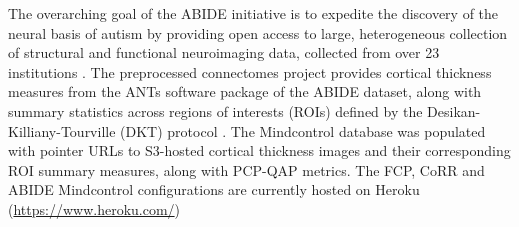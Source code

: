 The overarching goal of the ABIDE initiative is to expedite the discovery of the neural basis of autism by providing open access to large, heterogeneous collection of structural and functional neuroimaging data, collected from over 23 institutions \cite{Di_Martino_2013}. The preprocessed connectomes project provides cortical thickness measures from the ANTs software package \cite{avants2009advanced} of the ABIDE dataset, along with summary statistics across regions of interests (ROIs) defined by the Desikan-Killiany-Tourville (DKT) protocol \cite{Klein_2012}. The Mindcontrol database was populated with pointer URLs to S3-hosted cortical thickness images and their corresponding ROI summary measures, along with PCP-QAP metrics. The FCP, CoRR and ABIDE Mindcontrol configurations are currently hosted on Heroku (\href{http://www.heroku.com/}{https://www.heroku.com/})

